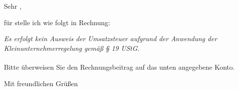 \documentclass[DIN,fromalign=center,paper=a4,fontsize=11pt]{scrlttr2}
\begin{document}
\begin{letter}{ \\
\\
}
\opening{Sehr  ,}
für  stelle ich wie folgt in Rechnung:
\begin{Rechnung}[N]
\PositionEin
\TrennerAus
{}


\end{Rechnung}
\textit{Es erfolgt kein Ausweis der Umsatzsteuer aufgrund der Anwendung der Kleinunternehmerregelung gemäß § 19 UStG.}\\\\
Bitte überweisen Sie den Rechnungsbeitrag auf das unten angegebene Konto.
\closing{Mit freundlichen Grüßen}
\end{letter}
\end{document}
